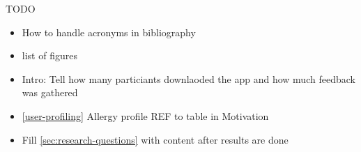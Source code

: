 \pagestyle{empty}
\LARGE
TODO
\normalsize
\begin{itemize}
    \item How to handle acronyms in bibliography
    \item list of figures
    \item Intro: Tell how many particiants downlaoded the app and how much feedback was gathered
    \item \ref{user-profiling} Allergy profile REF to table in Motivation
    \item Fill \ref{sec:research-questions} with content after results are done
\end{itemize}
\newpage




